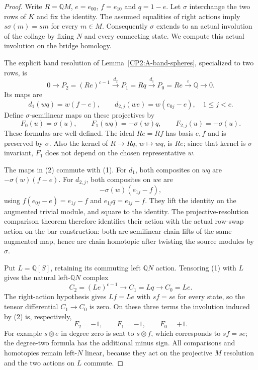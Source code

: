 \begin{proof}
Write $R=\mathbb QM$, $e=e_{00}$, $f=e_{10}$ and
$q=1-e$.  Let $\sigma$ interchange the two rows of
$K$ and fix the identity.  The assumed equalities of
right actions imply $s\sigma(m)=sm$ for every $m\in M$.
Consequently $\sigma$ extends to an actual involution
of the collage by fixing $N$ and every connecting state.
We compute this actual involution on the bridge homology.

The explicit band resolution of
Lemma~\ref{CP2:A-band-spheres}, specialized to two rows,
is
\[
 0\longrightarrow P_2=(Re)^{c-1}
   \xrightarrow{d_2}P_1=Rq
   \xrightarrow{d_1}P_0=Re
   \xrightarrow{\varepsilon}\mathbb Q\longrightarrow0.
\]
Its maps are
\[
 d_1(wq)=w(f-e),\qquad
 d_{2,j}(we)=w(e_{0j}-e),\quad 1\le j<c.
                                                               \tag{1}
\]
Define $\sigma$-semilinear maps on these projectives by
\[
 F_0(u)=\sigma(u),\qquad
 F_1(wq)=-\sigma(w)q,\qquad
 F_{2,j}(u)=-\sigma(u).                                      \tag{2}
\]
These formulas are well-defined.  The ideal $Re=Rf$
has basis $e,f$ and is preserved by $\sigma$.
Also the kernel of $R\to Rq$, $w\mapsto wq$, is
$Re$; since that kernel is $\sigma$ invariant, $F_1$
does not depend on the chosen representative $w$.

The maps in (2) commute with (1).  For $d_1$, both
composites on $wq$ are $-\sigma(w)(f-e)$.
For $d_{2,j}$, both composites on $we$ are
\[
 -\sigma(w)(e_{1j}-f),
\]
using $f(e_{0j}-e)=e_{1j}-f$ and
$e_{1j}q=e_{1j}-f$.
They lift the identity on the augmented trivial module,
and square to the identity.  The projective-resolution
comparison theorem therefore identifies their action
with the actual row-swap action on the bar construction:
both are semilinear chain lifts of the same augmented
map, hence are chain homotopic after twisting the
source modules by $\sigma$.

Put $L=\mathbb Q[S]$, retaining its commuting left
$\mathbb QN$ action.  Tensoring (1) with $L$ gives
the natural left-$\mathbb QN$ complex
\[
 C_2=(Le)^{c-1}\longrightarrow C_1=Lq
                   \longrightarrow C_0=Le.
\]
The right-action hypothesis gives $Lf=Le$ with
$sf=se$ for every state, so the tensor differential
$C_1\to C_0$ is zero.  On these three terms the
involution induced by (2) is, respectively,
\[
 F_2=-1,\qquad F_1=-1,\qquad F_0=+1.                    \tag{3}
\]
For example $s\otimes e$ in degree zero is sent to
$s\otimes f$, which corresponds to $sf=se$;
the degree-two formula has the additional minus sign.
All comparisons and homotopies remain left-$N$ linear,
because they act on the projective $M$ resolution and
the two actions on $L$ commute.


\end{proof}
